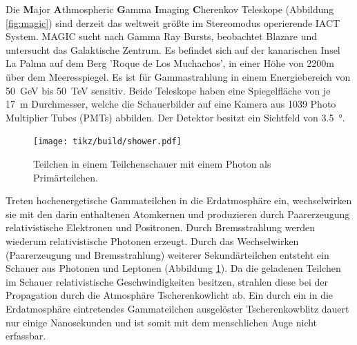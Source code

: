 

Die \textbf{M}ajor \textbf{A}thmospheric \textbf{G}amma \textbf{I}maging
\textbf{C}herenkov Teleskope (Abbildung \ref{fig:magic}) sind derzeit das
weltweit größte im Stereomodus operierende IACT System.
MAGIC sucht nach Gamma Ray Bursts, beobachtet Blazare und untersucht das
Galaktische Zentrum.
Es befindet sich auf der kanarischen Insel La Palma auf dem Berg 'Roque de Los Muchachos',
in einer Höhe von 2200m über dem Meeresspiegel.
Es ist für Gammastrahlung in einem Energiebereich von
\SI{50}{\giga\electronvolt} bis \SI{50}{\tera\electronvolt} sensitiv.
Beide Teleskope haben eine Spiegelfläche von je \SI{17}{\meter} Durchmesser,
welche die Schauerbilder auf eine Kamera aus 1039 Photo Multiplier Tubes (PMTs) abbilden.
Der Detektor besitzt ein Sichtfeld von \SI{3,5}{\degree}.

\begin{figure}
		\texttt{[image: tikz/build/shower.pdf]}
		\caption{Teilchen in einem Teilchenschauer mit einem Photon als
    Pri\-mär\-teil\-chen.}%
    \label{fig:schauer}
\end{figure}
Treten hochenergetische Gammateilchen in die Erdatmosphäre ein,
wechselwirken sie mit den darin enthaltenen Atomkernen
und produzieren durch Paarerzeugung relativistische Elektronen
und Positronen.
Durch Bremsstrahlung werden wiederum relativistische Photonen erzeugt.
Durch das Wechselwirken (Paarerzeugung und Bremsstrahlung) weiterer
Sekundärteilchen entsteht ein Schauer aus Photonen und Leptonen (Abbildung
\ref{fig:schauer}).
Da die geladenen Teilchen im Schauer relativistische Geschwindigkeiten besitzen,
strahlen diese bei der Propagation durch die Atmosphäre Tscherenkowlicht ab.
Ein durch ein in die Erdatmosphäre eintretendes Gammateilchen ausgelöster
Tscherenkowblitz dauert nur einige Nanosekunden
und ist somit mit dem menschlichen Auge nicht erfassbar.

